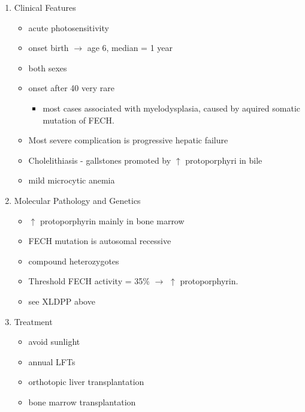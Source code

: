 \documentclass{scrartcl}
\begin{document}
\begin{enumerate}
\begin{enumerate}
\item Clinical Features
\label{sec:org1980960}
\begin{itemize}
\item acute photosensitivity
\item onset birth \(\to\) age 6, median = 1 year
\item both sexes
\item onset after 40 very rare
\begin{itemize}
\item most cases associated with myelodysplasia, caused by aquired
somatic mutation of FECH.
\end{itemize}
\item Most severe complication is progressive hepatic failure
\item Cholelithiasis - gallstones promoted by \(\uparrow\) protoporphyri in bile
\item mild microcytic anemia
\end{itemize}

\item Molecular Pathology and Genetics
\label{sec:org6830645}
\begin{itemize}
\item \(\uparrow\) protoporphyrin mainly in bone marrow
\item FECH mutation is autosomal recessive
\item compound heterozygotes
\item Threshold FECH activity = 35\% \(\to\) \(\uparrow\) protoporphyrin.
\item see XLDPP above
\end{itemize}
\item Treatment
\label{sec:org8e82a0e}
\begin{itemize}
\item avoid sunlight
\item annual LFTs
\item orthotopic liver transplantation
\item bone marrow transplantation
\end{itemize}
\end{enumerate}
\end{enumerate}
\end{document}
